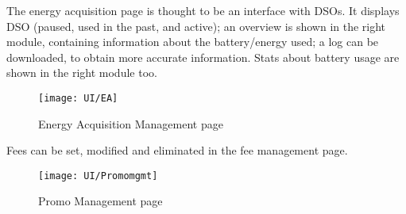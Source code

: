 The energy acquisition page is thought to be an interface with DSOs. It displays DSO (paused, used in the past, and active);
an overview is shown in the right module, containing information about the battery/energy used;
a log can be downloaded, to obtain more accurate information.
Stats about battery usage are shown in the right module too.

\begin{figure} [H]
    \begin{center}
        \texttt{[image: UI/EA]}
        \caption{Energy Acquisition Management page}
        \label{fig: ea}
    \end{center}
\end{figure}

Fees can be set, modified and eliminated in the fee management page.

\begin{figure} [H]
    \begin{center}
        \texttt{[image: UI/Promomgmt]}
        \caption{Promo Management page}
        \label{fig: promomgmt}
    \end{center}
\end{figure}